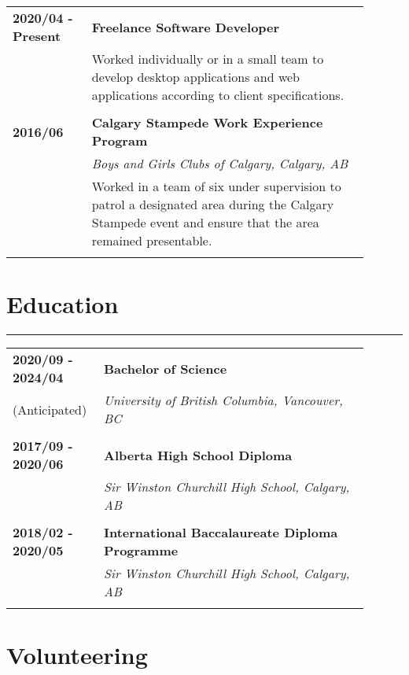 \documentclass[letterpaper]{article}
\newcommand{\horizontalLine}{%
    \rule{\linewidth}{0.2pt}
    \vspace{1ex}
}
\begin{document}
        \begin{tabular}{p{0.2\linewidth} p{0.7\linewidth}} 
            \textbf{2020/04 - Present} & \large\textbf{Freelance Software Developer} \\
            & Worked individually or in a small team to develop desktop applications and web applications according to client specifications. \\
            \\
            \textbf{2016/06} & \large\textbf{Calgary Stampede Work Experience Program} \\
            & \emph{Boys and Girls Clubs of Calgary, Calgary, AB} \\
            & Worked in a team of six under supervision to patrol a designated area during the Calgary Stampede event and ensure that the area remained presentable. \\
            \\
        \end{tabular}

    \section*{Education}

        \horizontalLine

        \begin{tabular}{p{0.2\linewidth} p{0.7\linewidth}} 
            \textbf{2020/09 - 2024/04} & \large\textbf{Bachelor of Science} \\
            (Anticipated) & \emph{University of British Columbia, Vancouver, BC} \\
            \\
            \textbf{2017/09 - 2020/06} & \large\textbf{Alberta High School Diploma} \\
            & \emph{Sir Winston Churchill High School, Calgary, AB} \\
            \\
            \textbf{2018/02 - 2020/05} & \large\textbf{International Baccalaureate Diploma Programme} \\
            & \emph{Sir Winston Churchill High School, Calgary, AB} \\
            \\
        \end{tabular}

    \section*{Volunteering}
\end{document}
